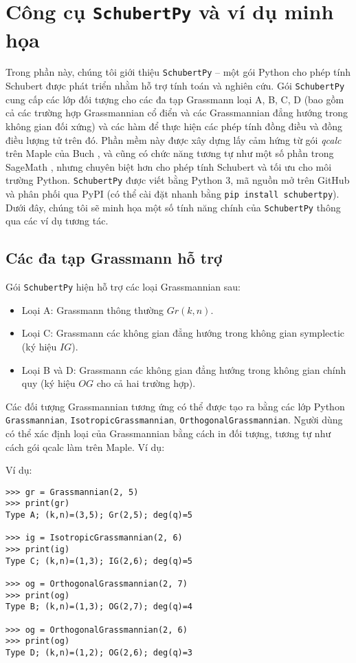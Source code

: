 \section{Công cụ \texttt{SchubertPy} và ví dụ minh họa}
Trong phần này, chúng tôi giới thiệu \texttt{SchubertPy} – một gói Python cho phép tính Schubert được phát triển nhằm hỗ trợ tính toán và nghiên cứu. Gói \texttt{SchubertPy} cung cấp các lớp đối tượng cho các đa tạp Grassmann loại A, B, C, D (bao gồm cả các trường hợp Grassmannian cổ điển và các Grassmannian đẳng hướng trong không gian đối xứng) và các hàm để thực hiện các phép tính đồng điều và đồng điều lượng tử trên đó. Phần mềm này được xây dựng lấy cảm hứng từ gói \textit{qcalc} trên Maple của Buch \cite{buch2008qcalc}, và cũng có chức năng tương tự như một số phần trong SageMath \cite{SageMath2024}, nhưng chuyên biệt hơn cho phép tính Schubert và tối ưu cho môi trường Python. \texttt{SchubertPy} được viết bằng Python 3, mã nguồn mở trên GitHub và phân phối qua PyPI (có thể cài đặt nhanh bằng \texttt{pip install schubertpy}). Dưới đây, chúng tôi sẽ minh họa một số tính năng chính của \texttt{SchubertPy} thông qua các ví dụ tương tác.

\subsection{Các đa tạp Grassmann hỗ trợ}
Gói \texttt{SchubertPy} hiện hỗ trợ các loại Grassmannian sau:
\begin{itemize}
    \item Loại A: Grassmann thông thường $Gr(k,n)$.
    \item Loại C: Grassmann các không gian đẳng hướng trong không gian symplectic (ký hiệu $IG$).
    \item Loại B và D: Grassmann các không gian đẳng hướng trong không gian chính quy (ký hiệu $OG$ cho cả hai trường hợp).
\end{itemize}
Các đối tượng Grassmannian tương ứng có thể được tạo ra bằng các lớp Python \texttt{Grassmannian}, \texttt{IsotropicGrassmannian}, \texttt{OrthogonalGrassmannian}. Người dùng có thể xác định loại của Grassmannian bằng cách in đối tượng, tương tự như cách gói qcalc làm trên Maple. Ví dụ:

Ví dụ:
\small
\begin{verbatim}
>>> gr = Grassmannian(2, 5)
>>> print(gr)
Type A; (k,n)=(3,5); Gr(2,5); deg(q)=5

>>> ig = IsotropicGrassmannian(2, 6)
>>> print(ig)
Type C; (k,n)=(1,3); IG(2,6); deg(q)=5

>>> og = OrthogonalGrassmannian(2, 7)
>>> print(og)
Type B; (k,n)=(1,3); OG(2,7); deg(q)=4

>>> og = OrthogonalGrassmannian(2, 6)
>>> print(og)
Type D; (k,n)=(1,2); OG(2,6); deg(q)=3
\end{verbatim}
\normalsize

